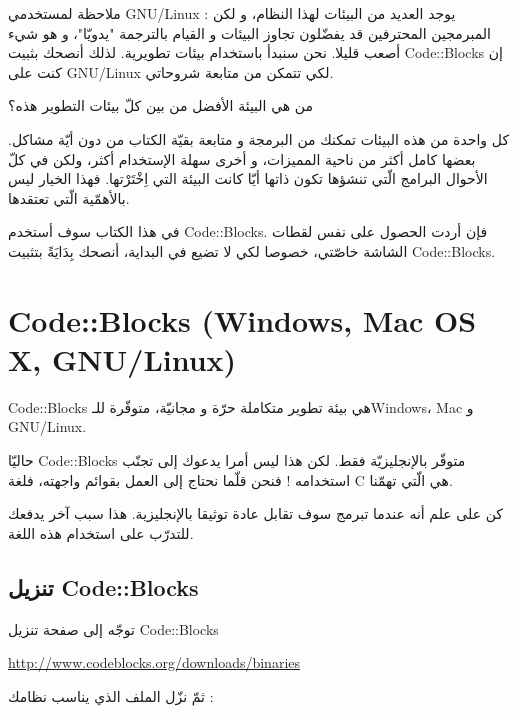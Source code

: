 \begin{information}
  ملاحظة لمستخدمي
  \textenglish{GNU/Linux} :
  يوجد العديد من البيئات لهذا النظام، و لكن المبرمجين المحترفين قد يفضّلون تجاوز البيئات و القيام بالترجمة "يدويّا"، و هو شيء أصعب قليلا. نحن سنبدأ باستخدام بيئات تطويرية. لذلك أنصحك بثبيت
  \textenglish{Code::Blocks}
  إن كنت على
  \textenglish{GNU/Linux}
  لكي تتمكن من متابعة شروحاتي.
\end{information}

\begin{question}
من هي البيئة الأفضل من بين كلّ بيئات التطوير هذه؟
\end{question}

كل واحدة من هذه البيئات تمكنك من البرمجة و متابعة بقيّة الكتاب من دون أيّة مشاكل. بعضها كامل أكثر من ناحية المميزات، و أخرى سهلة الإستخدام أكثر، ولكن في كلّ الأحوال البرامج الّتي تنشؤها تكون ذاتها أيّا كانت البيئة التي اِخْتَرْتها. فهذا الخيار ليس بالأهمّية الّتي تعتقدها.

في هذا الكتاب سوف أستخدم
\textenglish{Code::Blocks}.
فإن أردت الحصول على نفس لقطات الشاشة خاصّتي، خصوصا لكي لا تضيع في البداية، أنصحك بِدَايَةً بتثبيت
\textenglish{Code::Blocks}.

\section{\textenglish{Code::Blocks} (\textenglish{Windows, Mac OS X, GNU/Linux})}

\textenglish{Code::Blocks}
هي بيئة تطوير متكاملة حرّة و مجانيّة، متوفّرة للـ\textenglish{Windows}،
\textenglish{Mac}
و
\textenglish{GNU/Linux}.

حاليّا
\textenglish{Code::Blocks}
متوفّر بالإنجليزيّة فقط. لكن هذا ليس أمرا يدعوك إلى تجنّب استخدامه ! فنحن قلّما نحتاج إلى العمل بقوائم واجهته، فلغة
\textenglish{C}
هي الّتي تهمّنا.

كن على علم أنه عندما تبرمج سوف تقابل عادة توثيقا بالإنجليزية. هذا سبب آخر يدفعك للتدرّب على استخدام هذه اللغة.

\subsection{تنزيل \textenglish{Code::Blocks}}

توجّه إلى صفحة تنزيل
\textenglish{Code::Blocks}

\url{http://www.codeblocks.org/downloads/binaries}

ثمّ نزّل الملف الذي يناسب نظامك :

